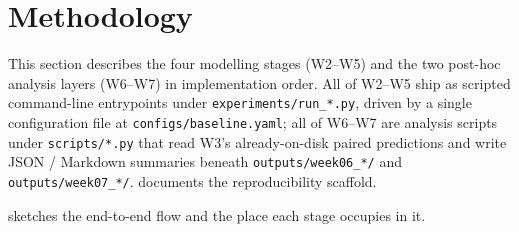 \documentclass[11pt,a4paper]{article}
\begin{document}
\clearpage\section{Methodology}
\label{sec:method}

This section describes the four modelling stages (W2--W5) and the
two post-hoc analysis layers (W6--W7) in implementation order.  All
of W2--W5 ship as scripted command-line entrypoints under
\texttt{experiments/run\_*.py}, driven by a single configuration
file at \texttt{configs/baseline.yaml}; all of W6--W7 are analysis
scripts under \texttt{scripts/*.py} that read W3's already-on-disk
paired predictions and write JSON / Markdown summaries beneath
\texttt{outputs/week06\_*/} and \texttt{outputs/week07\_*/}.
 documents the reproducibility scaffold.

 sketches the end-to-end flow and the place each
stage occupies in it.
\end{document}
